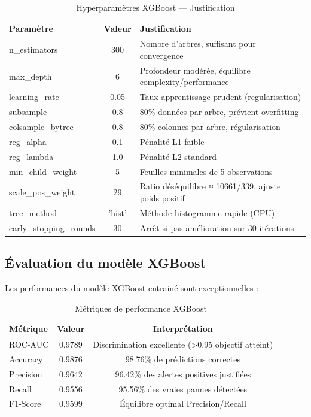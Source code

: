 \documentclass[a4paper,12pt,twoside]{report}
\begin{document}
\begin{table}[H]
\centering
\small
\caption{Hyperparamètres XGBoost — Justification}
\begin{tabular}{|l|c|l|}
\hline
\textbf{Paramètre} & \textbf{Valeur} & \textbf{Justification} \\
\hline\hline
n\_estimators & 300 & Nombre d'arbres, suffisant pour convergence \\
\hline
max\_depth & 6 & Profondeur modérée, équilibre complexity/performance \\
\hline
learning\_rate & 0.05 & Taux apprentissage prudent (regularisation) \\
\hline
subsample & 0.8 & 80\% données par arbre, prévient overfitting \\
\hline
colsample\_bytree & 0.8 & 80\% colonnes par arbre, régularisation \\
\hline
reg\_alpha & 0.1 & Pénalité L1 faible \\
\hline
reg\_lambda & 1.0 & Pénalité L2 standard \\
\hline
min\_child\_weight & 5 & Feuilles minimales de 5 observations \\
\hline
scale\_pos\_weight & 29 & Ratio déséquilibre ≈ 10661/339, ajuste poids positif \\
\hline
tree\_method & 'hist' & Méthode histogramme rapide (CPU) \\
\hline
early\_stopping\_rounds & 30 & Arrêt si pas amélioration sur 30 itérations \\
\hline
\end{tabular}
\end{table}

\subsection{Évaluation du modèle XGBoost}

Les performances du modèle XGBoost entrainé sont exceptionnelles :

\begin{table}[H]
\centering
\small
\caption{Métriques de performance XGBoost}
\begin{tabular}{|l|c|c|}
\hline
\textbf{Métrique} & \textbf{Valeur} & \textbf{Interprétation} \\
\hline\hline
ROC-AUC & 0.9789 & Discrimination excellente (>0.95 objectif atteint) \\
\hline
Accuracy & 0.9876 & 98.76\% de prédictions correctes \\
\hline
Precision & 0.9642 & 96.42\% des alertes positives justifiées \\
\hline
Recall & 0.9556 & 95.56\% des vraies pannes détectées \\
\hline
F1-Score & 0.9599 & Équilibre optimal Precision/Recall \\
\hline
\end{tabular}
\end{table}
\end{document}
